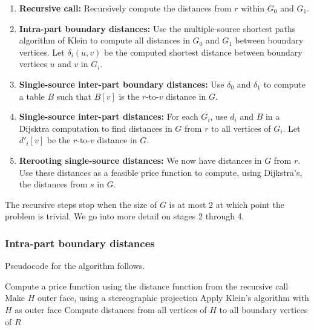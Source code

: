 \documentclass[11pt]{article}
\begin{document}
\begin{enumerate}

\item \textbf{Recursive call:} Recursively compute the distances from $r$ within $G_0$ and $G_1$.

\item \textbf{Intra-part boundary distances:} Use the multiple-source shortest paths algorithm of Klein to compute all distances in $G_0$ and $G_1$ between boundary vertices. Let $\delta_i(u,v)$ be the computed shortest distance between boundary vertices $u$ and $v$ in $G_i$.

\item \textbf{Single-source inter-part boundary distances:} Use $\delta_0$ and $\delta_1$ to compute a table $B$ such that $B[v]$ is the $r$-to-$v$ distance in $G$.

\item \textbf{Single-source inter-part distances:} For each $G_i$, use $d_i$ and $B$ in a Dijsktra computation to find distances in $G$ from $r$ to all vertices of $G_i$. Let $d'_i[v]$ be the $r$-to-$v$ distance in $G$.

\item \textbf{Rerooting single-source distances:} We now have distances in $G$ from $r$. Use these distances as a feasible price function to compute, using Dijkstra's, the distances from $s$ in $G$.

\end{enumerate}

The recursive steps stop when the size of $G$ is at most $2$ at which point the problem is trivial. We go into more detail on stages 2 through 4.

\subsubsection{Intra-part boundary distances}
\label{sec: intra-part boundary distances}

Pseudocode for the algorithm follows.

\begin{algorithm}[!htb]
    \label{alg:region}
    \begin{algorithmic}
            \State Compute a price function using the distance function from the recursive call
                \State Make $H$ outer face, using a stereographic projection
                \State Apply Klein's algorithm with $H$ as outer face
                \State Compute distances from all vertices of $H$ to all boundary vertices of $R$
            \EndFor
        \EndFor
    \end{algorithmic}
\end{algorithm}
\end{document}
